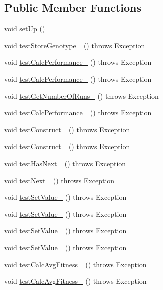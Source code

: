 \subsection*{Public Member Functions}
\begin{DoxyCompactItemize}
\item 
void \hyperlink{classorg_1_1jgap_1_1audit_1_1_evaluator_test_a3dacceb1d4a9c678b1c46391d2d99edb}{set\-Up} ()
\item 
void \hyperlink{classorg_1_1jgap_1_1audit_1_1_evaluator_test_aeb3e4e66dcf6954844e4876ca983353d}{test\-Store\-Genotype\-\_} ()  throws Exception 
\item 
void \hyperlink{classorg_1_1jgap_1_1audit_1_1_evaluator_test_a3bf01c2449a1467c907738c82b76e25f}{test\-Calc\-Performance\-\_} ()  throws Exception 
\item 
void \hyperlink{classorg_1_1jgap_1_1audit_1_1_evaluator_test_a6792b3a4d8e3965b3a12a6665d732ae8}{test\-Calc\-Performance\-\_} ()  throws Exception 
\item 
void \hyperlink{classorg_1_1jgap_1_1audit_1_1_evaluator_test_a352cdb796c96da72b6bb09bcb3bf75f3}{test\-Get\-Number\-Of\-Runs\-\_} ()  throws Exception 
\item 
void \hyperlink{classorg_1_1jgap_1_1audit_1_1_evaluator_test_a76465ab1f7038a61290781bc7b4d8898}{test\-Calc\-Performance\-\_} ()  throws Exception 
\item 
void \hyperlink{classorg_1_1jgap_1_1audit_1_1_evaluator_test_a2b9c1d8fd5d0dbf1a417b823efd06f4f}{test\-Construct\-\_} ()  throws Exception 
\item 
void \hyperlink{classorg_1_1jgap_1_1audit_1_1_evaluator_test_aaa855180e9082b81ce120f96b0d463f8}{test\-Construct\-\_} ()  throws Exception 
\item 
void \hyperlink{classorg_1_1jgap_1_1audit_1_1_evaluator_test_acc1496ed4ce458411dcd44aaac68b52b}{test\-Has\-Next\-\_} ()  throws Exception 
\item 
void \hyperlink{classorg_1_1jgap_1_1audit_1_1_evaluator_test_a578c2cc48402bf0e9969c09344331b68}{test\-Next\-\_} ()  throws Exception 
\item 
void \hyperlink{classorg_1_1jgap_1_1audit_1_1_evaluator_test_a6acce1390aa91757798854ef00bff366}{test\-Set\-Value\-\_} ()  throws Exception 
\item 
void \hyperlink{classorg_1_1jgap_1_1audit_1_1_evaluator_test_a0399ea0d11b65c4fcf855d2906863f0f}{test\-Set\-Value\-\_} ()  throws Exception 
\item 
void \hyperlink{classorg_1_1jgap_1_1audit_1_1_evaluator_test_a939a33a98920389177c75cf9f11936be}{test\-Set\-Value\-\_} ()  throws Exception 
\item 
void \hyperlink{classorg_1_1jgap_1_1audit_1_1_evaluator_test_afa6ce4ba8a9a9e13a9262689ebf62076}{test\-Set\-Value\-\_} ()  throws Exception 
\item 
void \hyperlink{classorg_1_1jgap_1_1audit_1_1_evaluator_test_aeab3e5673783a7bf19bb12e0d23f4985}{test\-Calc\-Avg\-Fitness\-\_} ()  throws Exception 
\item 
void \hyperlink{classorg_1_1jgap_1_1audit_1_1_evaluator_test_a6a64b57af56b6f0e88aee0736cda098f}{test\-Calc\-Avg\-Fitness\-\_} ()  throws Exception 
\end{DoxyCompactItemize}
